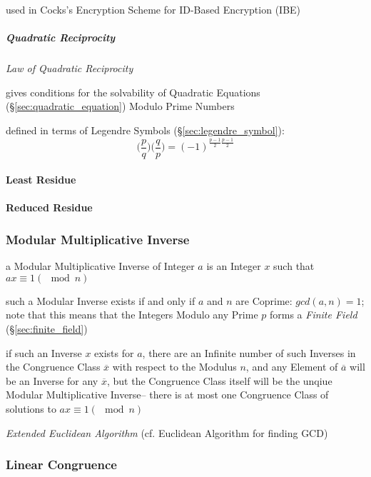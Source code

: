 used in Cocks's Encryption Scheme for ID-Based Encryption (IBE)



\subparagraph{Quadratic Reciprocity}\label{sec:quadratic_reciprocity}\hfill

\emph{Law of Quadratic Reciprocity}

gives conditions for the solvability of Quadratic Equations
(\S\ref{sec:quadratic_equation}) Modulo Prime Numbers

defined in terms of Legendre Symbols (\S\ref{sec:legendre_symbol}):
\[
  \Big(\frac{p}{q}\Big) \Big(\frac{q}{p}\Big) =
    (-1)^{\frac{p-1}{2}\frac{p-1}{2}}
\]



\paragraph{Least Residue}\label{sec:least_residue}\hfill

\paragraph{Reduced Residue}\label{sec:reduced_residue}\hfill



\subsubsection{Modular Multiplicative Inverse}\label{sec:modular_inverse}

a Modular Multiplicative Inverse of Integer $a$ is an Integer $x$ such that
$ax \equiv 1 (\mod n)$

such a Modular Inverse exists if and only if $a$ and $n$ are Coprime:
$gcd(a,n)=1$; note that this means that the Integers Modulo any Prime $p$ forms
a \emph{Finite Field} (\S\ref{sec:finite_field})

if such an Inverse $x$ exists for $a$, there are an Infinite number of such
Inverses in the Congruence Class $\overline{x}$ with respect to the Modulus $n$,
and any Element of $\overline{a}$ will be an Inverse for any $\overline{x}$, but
the Congruence Class itself will be the unqiue Modular Multiplicative Inverse--
there is at most one Congruence Class of solutions to $ax \equiv 1 (\mod n)$

\emph{Extended Euclidean Algorithm} (cf. Euclidean Algorithm for finding GCD)



\subsubsection{Linear Congruence}\label{sec:linear_congruence}

